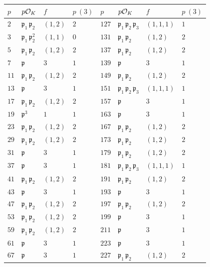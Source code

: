 \begin{figure}
\begin{center}
\renewcommand{\arraystretch}{1.5}
\begin{tabular}{x{1.25cm}x{1.25cm}x{1.25cm}x{1.25cm}x{1.25cm}x{1.25cm}x{1.25cm}x{1.25cm}}
$p$ & $p\mathcal{O}_K$ & $f$ & $p~(3)$ & $p$ & $p\mathcal{O}_K$ & $f$ & $p~(3)$ \tabularnewline
\hline
$2$ & $\mathfrak{p}_1\,\mathfrak{p}_2$ & $(1,2)$ & $2$ & $127$ & $\mathfrak{p}_1\,\mathfrak{p}_2\,\mathfrak{p}_3$ & $(1,1,1)$ & $1$ \tabularnewline
\hline
$3$ & $\mathfrak{p}_1\,\mathfrak{p}_2^2$ & $(1,1)$ & $0$ & $131$ & $\mathfrak{p}_1\,\mathfrak{p}_2$ & $(1,2)$ & $2$ \tabularnewline
\hline
$5$ & $\mathfrak{p}_1\,\mathfrak{p}_2$ & $(1,2)$ & $2$ & $137$ & $\mathfrak{p}_1\,\mathfrak{p}_2$ & $(1,2)$ & $2$ \tabularnewline
\hline
$7$ & $\mathfrak{p}$ & $3$ & $1$ & $139$ & $\mathfrak{p}$ & $3$ & $1$ \tabularnewline
\hline
$11$ & $\mathfrak{p}_1\,\mathfrak{p}_2$ & $(1,2)$ & $2$ & $149$ & $\mathfrak{p}_1\,\mathfrak{p}_2$ & $(1,2)$ & $2$ \tabularnewline
\hline
$13$ & $\mathfrak{p}$ & $3$ & $1$ & $151$ & $\mathfrak{p}_1\,\mathfrak{p}_2\,\mathfrak{p}_3$ & $(1,1,1)$ & $1$ \tabularnewline
\hline
$17$ & $\mathfrak{p}_1\,\mathfrak{p}_2$ & $(1,2)$ & $2$ & $157$ & $\mathfrak{p}$ & $3$ & $1$ \tabularnewline
\hline
$19$ & $\mathfrak{p}^3$ & $1$ & $1$ & $163$ & $\mathfrak{p}$ & $3$ & $1$ \tabularnewline
\hline
$23$ & $\mathfrak{p}_1\,\mathfrak{p}_2$ & $(1,2)$ & $2$ & $167$ & $\mathfrak{p}_1\,\mathfrak{p}_2$ & $(1,2)$ & $2$ \tabularnewline
\hline
$29$ & $\mathfrak{p}_1\,\mathfrak{p}_2$ & $(1,2)$ & $2$ & $173$ & $\mathfrak{p}_1\,\mathfrak{p}_2$ & $(1,2)$ & $2$ \tabularnewline
\hline
$31$ & $\mathfrak{p}$ & $3$ & $1$ & $179$ & $\mathfrak{p}_1\,\mathfrak{p}_2$ & $(1,2)$ & $2$ \tabularnewline
\hline
$37$ & $\mathfrak{p}$ & $3$ & $1$ & $181$ & $\mathfrak{p}_1\,\mathfrak{p}_2\,\mathfrak{p}_3$ & $(1,1,1)$ & $1$ \tabularnewline
\hline
$41$ & $\mathfrak{p}_1\,\mathfrak{p}_2$ & $(1,2)$ & $2$ & $191$ & $\mathfrak{p}_1\,\mathfrak{p}_2$ & $(1,2)$ & $2$ \tabularnewline
\hline
$43$ & $\mathfrak{p}$ & $3$ & $1$ & $193$ & $\mathfrak{p}$ & $3$ & $1$ \tabularnewline
\hline
$47$ & $\mathfrak{p}_1\,\mathfrak{p}_2$ & $(1,2)$ & $2$ & $197$ & $\mathfrak{p}_1\,\mathfrak{p}_2$ & $(1,2)$ & $2$ \tabularnewline
\hline
$53$ & $\mathfrak{p}_1\,\mathfrak{p}_2$ & $(1,2)$ & $2$ & $199$ & $\mathfrak{p}$ & $3$ & $1$ \tabularnewline
\hline
$59$ & $\mathfrak{p}_1\,\mathfrak{p}_2$ & $(1,2)$ & $2$ & $211$ & $\mathfrak{p}$ & $3$ & $1$ \tabularnewline
\hline
$61$ & $\mathfrak{p}$ & $3$ & $1$ & $223$ & $\mathfrak{p}$ & $3$ & $1$ \tabularnewline
\hline
$67$ & $\mathfrak{p}$ & $3$ & $1$ & $227$ & $\mathfrak{p}_1\,\mathfrak{p}_2$ & $(1,2)$ & $2$ \tabularnewline

\end{tabular}
\end{center}
\end{figure}
